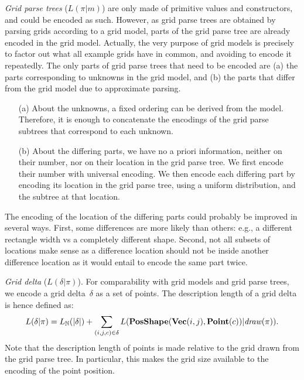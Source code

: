 \documentclass[a4paper]{llncs}
\newcommand{\nat}{\mathbb{N}}
\begin{document}
{\em Grid parse trees} ($L(\pi|m)$) are only made of primitive values
and constructors, and could be encoded as such. However, as grid parse
trees are obtained by parsing grids according to a grid model, parts
of the grid parse tree are already encoded in the grid
model. Actually, the very purpose of grid models is precisely to
factor out what all example grids have in common, and avoiding to
encode it repeatedly. The only parts of grid parse trees that need to
be encoded are (a) the parts corresponding to unknowns in the grid
model, and (b) the parts that differ from the grid model due to
approximate parsing.
\begin{itemize}
\item[(a)] About the unknowns, a fixed ordering can be derived from
  the model. Therefore, it is enough to concatenate the encodings of
  the grid parse subtrees that correspond to each unknown.
\item[(b)] About the differing parts, we have no a priori information,
  neither on their number, nor on their location in the grid parse
  tree. We first encode their number with universal encoding. We then
  encode each differing part by encoding its location in the grid
  parse tree, using a uniform distribution, and the subtree at that
  location.
\end{itemize}
The encoding of the location of the differing parts could probably be
improved in several ways. First, some differences are more likely than
others: e.g., a different rectangle width vs a completely different
shape. Second, not all subsets of locations make sense as a difference
location should not be inside another difference location as it would
entail to encode the same part twice.

{\em Grid delta} ($L(\delta|\pi)$). For comparability with grid models and grid parse
trees, we encode a grid delta~$\delta$ as a set of points.  The
description length of a grid delta is hence defined as:
\[ L(\delta|\pi) = L_\nat(|\delta|) + \sum_{(i,j,c) \in \delta} L({\bf PosShape}({\bf Vec}(i,j), {\bf Point}(c))|{\it draw}(\pi)). \]
%
Note that the description length of points is made relative to the
grid drawn from the grid parse tree. In particular, this makes the
grid size available to the encoding of the point position.
\end{document}

